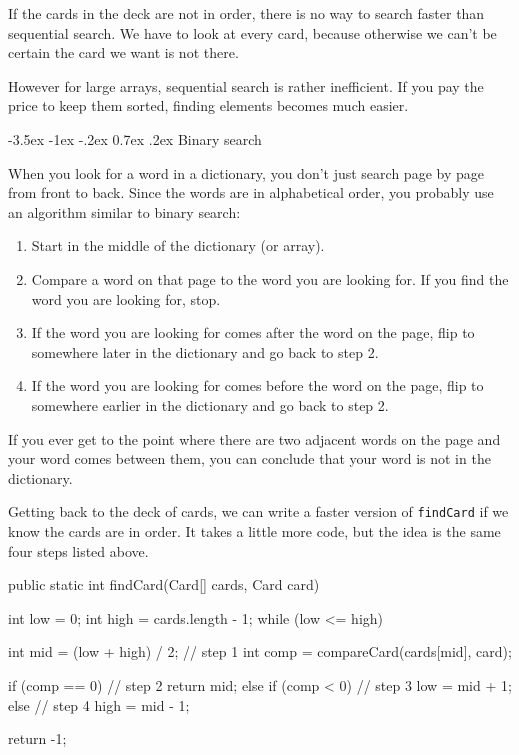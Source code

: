 \documentclass[12pt]{book}
\makeatletter
\renewcommand{\section}{\@startsection {section}{1}{\z@}%
    {-3.5ex \@plus -1ex \@minus -.2ex}%
    {0.7ex \@plus.2ex}%
    {\normalfont\Large\bfseries}}
\theoremstyle{exercise}
\newcommand{\java}[1]{\lstinline{#1}} %
\makeatother
\begin{document}
If the cards in the deck are not in order, there is no way to search faster than sequential search.
We have to look at every card, because otherwise we can't be certain the card we want is not there.

However for large arrays, sequential search is rather inefficient.
If you pay the price to keep them sorted, finding elements becomes much easier.


\section{Binary search}

When you look for a word in a dictionary, you don't just search page by page from front to back.
Since the words are in alphabetical order, you probably use an algorithm similar to binary search:

\begin{enumerate}
\item Start in the middle of the dictionary (or array).
\item Compare a word on that page to the word you are looking for.
If you find the word you are looking for, stop.
\item If the word you are looking for comes after the word on the page, flip to somewhere later in the dictionary and go back to step 2.
\item If the word you are looking for comes before the word on the page, flip to somewhere earlier in the dictionary and go back to step 2.
\end {enumerate}

If you ever get to the point where there are two adjacent words on the page and your word comes between them, you can conclude that your word is not in the dictionary.

Getting back to the deck of cards, we can write a faster version of \java{findCard} if we know the cards are in order.
It takes a little more code, but the idea is the same four steps listed above.

\begin{code}
public static int findCard(Card[] cards, Card card) {
    int low = 0;
    int high = cards.length - 1;
    while (low <= high) {
        int mid = (low + high) / 2;                   // step 1
        int comp = compareCard(cards[mid], card);

        if (comp == 0) {                              // step 2
            return mid;
        } else if (comp < 0) {                        // step 3
            low = mid + 1;
        } else {                                      // step 4
            high = mid - 1;
        }
    }
    return -1;
}
\end{code}
\end{document}
